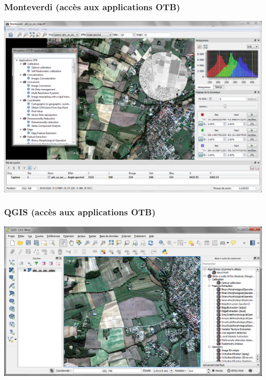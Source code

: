 \documentclass[8pt]{beamer}
\begin{document}
\begin{frame}
\frametitle{Monteverdi (accès aux applications OTB)}
\begin{minipage}[t][6cm][t]{\textwidth}
\begin{center}
\includegraphics[width=1.0\textwidth]{../OTB-General/images/monteverdi.png}
\end{center}
\end{minipage}
\end{frame}

\begin{frame}
  \frametitle{QGIS (accès aux applications OTB)}
\begin{minipage}[t][6cm][t]{\textwidth}
\begin{center}
\includegraphics[width=1\textwidth]{../OTB-General/images/otb_in_qgis.png}
\end{center}
\end{minipage}
\end{frame}
\end{document}
